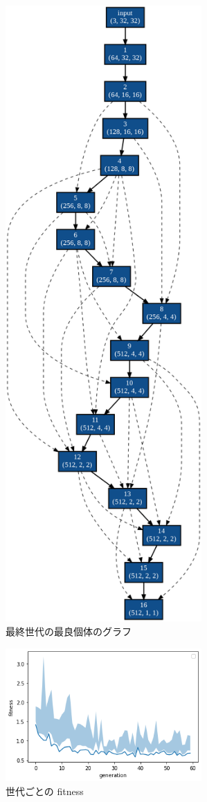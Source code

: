 \documentclass[twocolumn]{jarticle}     %
\begin{document}
\begin{figure}[tb]
  \begin{center}
    \includegraphics[clip,width=75mm]{graph_150.png}
    \caption{最終世代の最良個体のグラフ}
    \label{fig:graph}
  \end{center}
\end{figure}

\begin{figure}[tb]
  \begin{center}
    \includegraphics[clip,width=75mm]{fit.png}
    \caption{世代ごとの fitness}
    \label{fig:fit}
  \end{center}
\end{figure}
\end{document}
